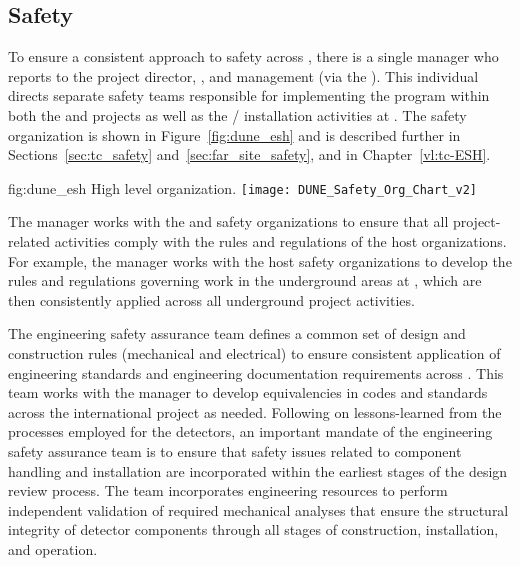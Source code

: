 \subsection{Safety}
\label{sec:dune_safety}

To ensure a consistent approach to safety across ,
there is a single   manager who reports 
to the  project director, , and 
management (via the  ).  This individual
directs separate safety teams responsible for implementing the
  program within both the  
and  projects as well as the /
installation activities at . The safety organization 
is shown in Figure~\ref{fig:dune_esh} and is described further in
Sections~\ref{sec:tc_safety} and~\ref{sec:far_site_safety}, and in 
Chapter~\ref{vl:tc-ESH}.
\begin{dunefigure}{fig:dune_esh}
  {High level   organization.}
  \texttt{[image: DUNE\_Safety\_Org\_Chart\_v2]}
\end{dunefigure}
The   manager works with the  
and  safety organizations to ensure that all project-related 
activities comply with the rules and regulations of the host 
organizations.  For example, the   manager 
works with the host safety organizations to develop the rules and 
regulations governing work in the underground areas at , 
which are then consistently applied across all underground project 
activities.

The  engineering safety assurance team defines a common 
set of design and construction rules (mechanical and electrical) to 
ensure consistent application of engineering standards and engineering 
documentation requirements across .  This team works 
with the   manager to develop equivalencies 
in codes and standards across the international project as needed.  
Following on lessons-learned from the processes employed for the 
 detectors, an important mandate of the engineering 
safety assurance team is to ensure that safety issues related to 
component handling and installation are incorporated within the 
earliest stages of the design review process.  The  team 
incorporates engineering resources to perform independent validation 
of required mechanical analyses that ensure the structural integrity 
of detector components through all stages of construction, installation, 
and operation.


